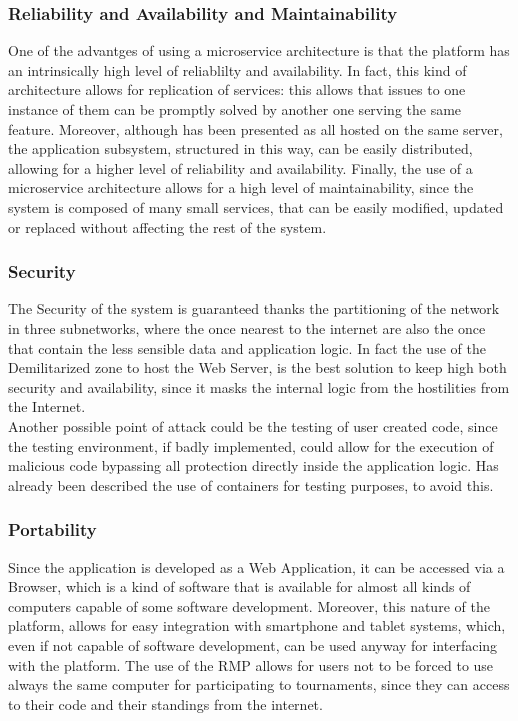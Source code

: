 \subsubsection{Reliability and Availability and Maintainability}
One of the advantges of using a microservice architecture is that the platform has an intrinsically high level of reliablilty and availability. 
In fact, this kind of architecture allows for replication of services: this allows that issues to one instance of them can be promptly solved by another one serving the same feature. 
Moreover, although has been presented as all hosted on the same server, the application subsystem, structured in this way, can be easily distributed, allowing for a higher level of reliability and availability.
Finally, the use of a microservice architecture allows for a high level of maintainability, since the system is composed of many small services, that can be easily modified, updated or replaced without affecting the rest of the system.\\
\subsubsection{Security}
The Security of the system is guaranteed thanks the partitioning of the network in three subnetworks, where the once nearest to the internet are also the once that contain the less sensible data and application logic. In fact the use of the Demilitarized zone to host the Web Server, is the best solution to keep high both security and availability, since it masks the internal logic from the hostilities from the Internet.\\ 
Another possible point of attack could be the testing of user created code, since the testing environment, if badly implemented, could allow for the execution of malicious code bypassing all protection directly inside the application logic. 
Has already been described the use of containers for testing purposes, to avoid this.
\subsubsection{Portability}
Since the application is developed as a Web Application, it can be accessed via a Browser, which is a kind of software that is available for almost all kinds of computers capable of some software development. 
Moreover, this nature of the platform, allows for easy integration with smartphone and tablet systems, which, even if not capable of software development, can be used anyway for interfacing with the platform.
The use of the RMP allows for users not to be forced to use always the same computer for participating to tournaments, since they can access to their code and their standings from the internet.